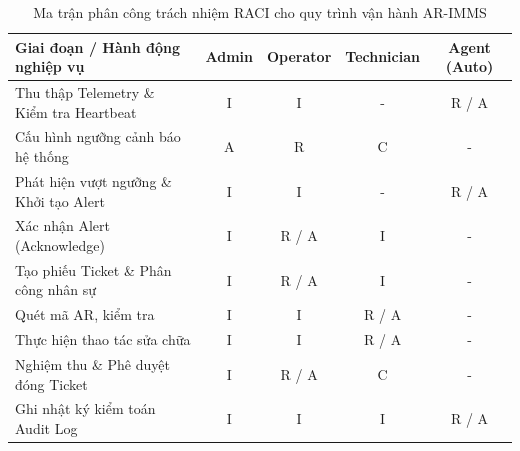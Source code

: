 \begin{table}[H]
\centering
\begin{tabularx}{\textwidth}{|X|c|c|c|c|}
\hline
\textbf{Giai đoạn / Hành động nghiệp vụ} & \textbf{Admin} & \textbf{Operator} & \textbf{Technician} & \textbf{Agent (Auto)} \\ \hline
Thu thập Telemetry \& Kiểm tra Heartbeat & I & I & - & R / A \\ \hline
Cấu hình ngưỡng cảnh báo hệ thống & A & R & C & - \\ \hline
Phát hiện vượt ngưỡng \& Khởi tạo Alert & I & I & - & R / A \\ \hline
Xác nhận Alert (Acknowledge) & I & R / A & I & - \\ \hline
Tạo phiếu Ticket \& Phân công nhân sự & I & R / A & I & - \\ \hline
Quét mã AR, kiểm tra & I & I & R / A & - \\ \hline
Thực hiện thao tác sửa chữa & I & I & R / A & - \\ \hline
Nghiệm thu \& Phê duyệt đóng Ticket & I & R / A & C & - \\ \hline
Ghi nhật ký kiểm toán Audit Log & I & I & I & R / A \\ \hline
\end{tabularx}
\caption{Ma trận phân công trách nhiệm RACI cho quy trình vận hành AR-IMMS}
\end{table}

